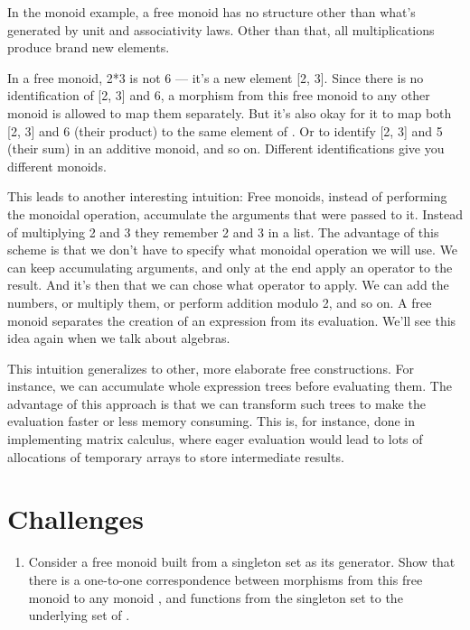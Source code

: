 \noindent
In the monoid example, a free monoid has no structure other than what's
generated by unit and associativity laws. Other than that, all
multiplications produce brand new elements.

In a free monoid, 2*3 is not 6 --- it's a new element {[}2, 3{]}. Since
there is no identification of {[}2, 3{]} and 6, a morphism from this
free monoid to any other monoid  is allowed to map them
separately. But it's also okay for it to map both {[}2, 3{]} and 6
(their product) to the same element of . Or to identify {[}2,
3{]} and 5 (their sum) in an additive monoid, and so on. Different
identifications give you different monoids.

This leads to another interesting intuition: Free monoids, instead of
performing the monoidal operation, accumulate the arguments that were
passed to it. Instead of multiplying 2 and 3 they remember 2 and 3 in a
list. The advantage of this scheme is that we don't have to specify what
monoidal operation we will use. We can keep accumulating arguments, and
only at the end apply an operator to the result. And it's then that we
can chose what operator to apply. We can add the numbers, or multiply
them, or perform addition modulo 2, and so on. A free monoid separates
the creation of an expression from its evaluation. We'll see this idea
again when we talk about algebras.

This intuition generalizes to other, more elaborate free constructions.
For instance, we can accumulate whole expression trees before evaluating
them. The advantage of this approach is that we can transform such trees
to make the evaluation faster or less memory consuming. This is, for
instance, done in implementing matrix calculus, where eager evaluation
would lead to lots of allocations of temporary arrays to store
intermediate results.

\section{Challenges}\label{challenges}

\begin{enumerate}
\tightlist
\item
  Consider a free monoid built from a singleton set as its generator.
  Show that there is a one-to-one correspondence between morphisms from
  this free monoid to any monoid , and functions from the
  singleton set to the underlying set of .
\end{enumerate}